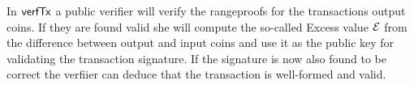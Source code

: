 In $\mathsf{verfTx}$ a public verifier will verify the rangeproofs for the transactions output coins. If they are found valid she will compute the so-called Excess value $\mathcal{E}$ from the difference between output and input coins
and use it as the public key for validating the transaction signature. If the signature is now also found to be correct the verfiier can deduce that the transaction is well-formed and valid.

\begin{figure}
    \begin{center}
\end{center}
\end{figure}
